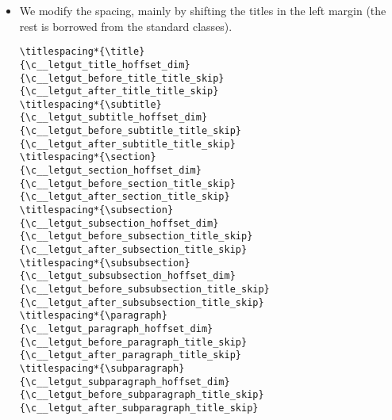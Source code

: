\documentclass{letgut}
\begin{document}
\begin{itemize}
\begin{itemize}
\item The (sub)paragraphs have the usual format, except that they are not
“runin” ('s package's terminology).
\end{itemize}
\begin{lstlisting}
  \titleformat{\paragraph}{
    \normalfont
    \normalsize
    \bfseries
  }{\theparagraph}{1em}{}
  \titleformat{\subparagraph}{
    \normalfont
    \normalsize
    \bfseries
  }{\thesubparagraph}{1em}{}
}
\end{lstlisting}
\item We modify the spacing, mainly by shifting the titles in the left margin (the
rest is borrowed from the standard classes).
\begin{lstlisting}
\titlespacing*{\title}
{\c__letgut_title_hoffset_dim}
{\c__letgut_before_title_title_skip}
{\c__letgut_after_title_title_skip}
\titlespacing*{\subtitle}
{\c__letgut_subtitle_hoffset_dim}
{\c__letgut_before_subtitle_title_skip}
{\c__letgut_after_subtitle_title_skip}
\titlespacing*{\section}
{\c__letgut_section_hoffset_dim}
{\c__letgut_before_section_title_skip}
{\c__letgut_after_section_title_skip}
\titlespacing*{\subsection}
{\c__letgut_subsection_hoffset_dim}
{\c__letgut_before_subsection_title_skip}
{\c__letgut_after_subsection_title_skip}
\titlespacing*{\subsubsection}
{\c__letgut_subsubsection_hoffset_dim}
{\c__letgut_before_subsubsection_title_skip}
{\c__letgut_after_subsubsection_title_skip}
\titlespacing*{\paragraph}
{\c__letgut_paragraph_hoffset_dim}
{\c__letgut_before_paragraph_title_skip}
{\c__letgut_after_paragraph_title_skip}
\titlespacing*{\subparagraph}
{\c__letgut_subparagraph_hoffset_dim}
{\c__letgut_before_subparagraph_title_skip}
{\c__letgut_after_subparagraph_title_skip}
\end{lstlisting}
\end{itemize}
\end{document}
